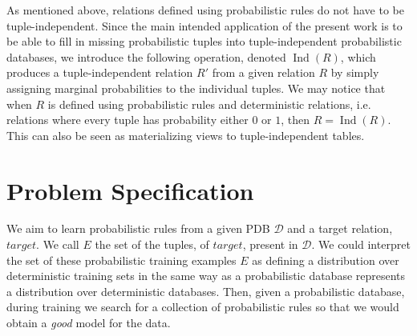 \documentclass[akbc,twoside,11pt]{article}
\newcounter{example}
\newenvironment{example}[1][]{\refstepcounter{example}\par\medskip\noindent
   \textbf{Example~\theexample #1} \rmfamily}{\medskip}
\begin{document}
As mentioned above, relations defined using probabilistic rules do not have to be tuple-independent. Since the main intended application of the present work is to be able to fill in missing probabilistic tuples into tuple-independent probabilistic databases, we introduce the following operation, denoted $\operatorname{Ind}(R)$, which produces a tuple-independent relation $R'$ from a given relation $R$ by simply assigning marginal probabilities to the individual tuples. We may notice that when $R$ is defined using probabilistic rules and deterministic relations, i.e. relations where every tuple has probability either $0$ or $1$, then $R = \operatorname{Ind}(R)$. This can also be seen as {materializing views to tuple-independent tables.}




\section{Problem Specification}
\label{sec:problem}
We aim to learn probabilistic rules from a given PDB $\mathcal{D}$ and a target relation, $target$. We call $E$ the set of the tuples, of $target$, present in  $\mathcal{D}$. We could interpret the set of these probabilistic training examples $E$ as defining a distribution over deterministic training sets in the same way as a probabilistic database represents a distribution over deterministic databases. Then, given a probabilistic database, during training we search for a collection of probabilistic rules so that we would obtain a {\it good} model for the data. 
\end{document}
